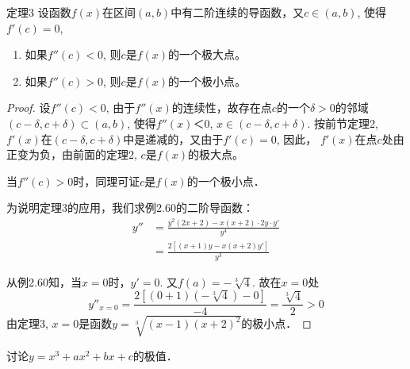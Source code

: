 \begin{solution}
\begin{figure}[htp]
    \caption{}
\end{figure}
\end{solution}

\begin{blk}
{定理3} 设函数$f(x)$在区间$(a,b)$中有二阶连续的导函数，又$c\in (a,b)$, 使得$f' (c) =0$,
\begin{enumerate}
    \item 如果$f''(c)<0$, 则$c$是$f(x)$的一个极大点。
    \item 如果$f''(c)>0$, 则$c$是$f(x)$的一个极小点。
\end{enumerate}
\end{blk}

\begin{proof}
设$f''(c)<0$, 由于$f''(x)$的连续性，故存在点$c$的一个$\delta>0$的邻域$(c-\delta,c+\delta)\subset (a,b)$, 使得$f''(x)＜0$, $x\in (c-\delta,c+\delta)$. 按前节定理2, $f'(x)$在$(c-\delta,c+\delta)$中是递减的，又由于$f'(c)=0$, 因此，
$f'(x)$在点$c$处由正变为负，由前面的定理2, $c$是$f(x)$的极大点。

当$f''(c)>0$时，同理可证$c$是$f(x)$的一个极小点．

为说明定理3的应用，我们求例2.60的二阶导函数：
\[\begin{split}
   y''&=\frac{y^2 (2x+2) -x (x+2) \cdot 2y\cdot y'}{y^4}\\
&=\frac{2 [ (x+1) y-x (x+2) y']}{y^3} 
\end{split}\]

从例2.60知，当$x=0$时，$y'=0$. 又$f(a)=-\sqrt[3]{4}$. 故在$x=0$处
\[y''_{x=0}=\frac{2\left[(0+1)\left(-\sqrt[3]{4}\right)-0\right]}{-4}=\frac{\sqrt[3]{4}}{2}>0\]
由定理3, $x=0$是函数$y=\sqrt[3]{(x-1)(x+2)^2}$的极小点．
\end{proof}




\begin{example}
    讨论$y=x^3+ax^2+bx+c$的极值．
\end{example}


